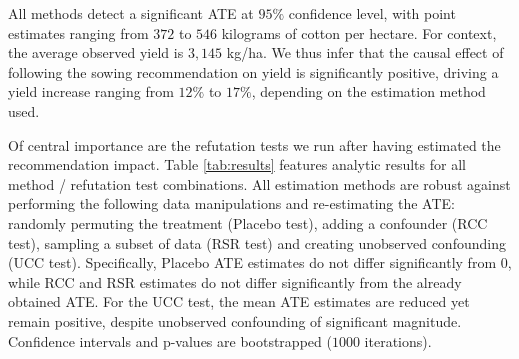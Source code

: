 \documentclass[letterpaper]{article} %
\begin{document}
All methods detect a significant ATE at $95\%$ confidence level, with point estimates ranging from $372$ to $546$ kilograms of cotton per hectare. For context, the average observed yield is $3,145$ kg/ha. We thus infer that the causal effect of following the sowing recommendation on yield is significantly positive, driving a yield increase ranging from $12\%$ to $17\%$, depending on the estimation method used.

Of central importance are the refutation tests we run after having estimated the recommendation impact. Table \ref{tab:results} features analytic results for all method / refutation test combinations. All estimation methods are robust against performing the following data manipulations and re-estimating the ATE: randomly permuting the treatment (Placebo test), adding a confounder (RCC test), sampling a subset of data (RSR test) and creating unobserved confounding (UCC test). Specifically, Placebo ATE estimates do not differ significantly from $0$, while RCC and RSR estimates do not differ significantly from the already obtained ATE. For the UCC test, the mean ATE estimates are reduced yet remain positive, despite unobserved confounding of significant magnitude. Confidence intervals and p-values are bootstrapped ($1000$ iterations).
\end{document}
